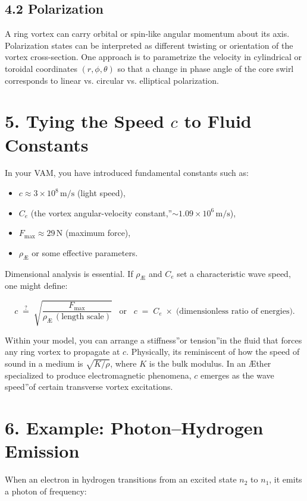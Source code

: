 \subsection*{4.2 Polarization}
A ring vortex can carry orbital or spin-like angular momentum about its axis. Polarization states can be interpreted as different twisting or orientation of the vortex cross-section. One approach is to parametrize the velocity in cylindrical or toroidal coordinates \((r,\phi,\theta)\) so that a change in phase angle of the core swirl corresponds to linear vs. circular vs. elliptical polarization.

\section*{5. Tying the Speed \(c\) to Fluid Constants}
In your VAM, you have introduced fundamental constants such as:

\begin{itemize}
 \item \(c \approx 3\times10^8\,\mathrm{m/s}\) (light speed),
 \item \(C_e\) (the \grqq vortex angular-velocity constant,\textquotedblright \(\sim 1.09\times10^6\,\mathrm{m/s}\)),
 \item \(F_{\max} \approx 29\,\mathrm{N}\) (maximum force),
 \item \(\rho_{\scriptscriptstyle\mathrm{Æ}}\) or some effective parameters.
\end{itemize}

Dimensional analysis is essential. If \(\rho_{\scriptscriptstyle \mathrm{Æ}}\) and \(C_e\) set a characteristic wave speed, one might define:

\[
 c \;\stackrel{?}{=}\; \sqrt{ \frac{F_{\max}}{\rho_{\scriptscriptstyle \mathrm{Æ}}\,(\text{length scale})} } \;\;\;\text{or}\;\;\; c \;=\; C_e \;\times\; \bigl(\text{dimensionless ratio of energies}\bigr).
\]

Within your model, you can arrange a \grqq stiffness\textquotedblright or \grqq tension\textquotedblright in the fluid that forces any ring vortex to propagate at \(c\). Physically, it\rqs s reminiscent of how the speed of sound in a medium is \(\sqrt{K/\rho}\), where \(K\) is the bulk modulus. In an Æther specialized to produce electromagnetic phenomena, \(c\) emerges as the \grqq wave speed\textquotedblright of certain transverse vortex excitations.

\section*{6. Example: Photon–Hydrogen Emission}
When an electron in hydrogen transitions from an excited state \(n_2\) to \(n_1\), it emits a photon of frequency:

